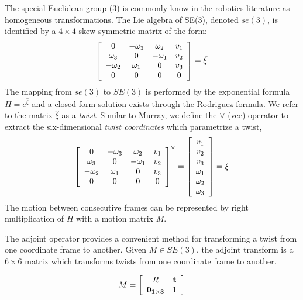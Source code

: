 \documentclass[a4paper,10pt]{article}
\title{}
\author{}
\begin{document}
The special Euclidean group (3) is commonly know in the robotics literature as
homogeneous transformations.  The Lie algebra of SE(3), denoted $se(3)$, is
identified by a $4\times4$ skew symmetric matrix of the form:
\begin{equation}
\left[\begin{array}{c c c c}
  0 & -\omega_3 & \omega_2 & v_1 \\
  \omega_3 & 0 & -\omega_1 & v_2 \\
  -\omega_2 & \omega_1 & 0 & v_3 \\
  0 & 0 & 0 & 0 \\
\end{array}\right] = \hat{\xi}
\end{equation}
The mapping from $se(3)$ to $SE(3)$ is performed
by the exponential formula $H = e^{\hat{\xi}}$ and a closed-form solution
exists through the Rodriguez formula.  We refer to the matrix $\hat{\xi}$ as a
{\it twist}. Similar to Murray, we define the $\vee$
(vee) operator to extract the six-dimensional {\it twist coordinates}
which parametrize a twist,
\begin{equation}
\left[\begin{array}{c c c c}
  0 & -\omega_3 & \omega_2 & v_1 \\
  \omega_3 & 0 & -\omega_1 & v_2 \\
  -\omega_2 & \omega_1 & 0 & v_3 \\
  0 & 0 & 0 & 0 \\
\end{array}\right]^{\vee} =
\left[\begin{array}{c}
  v_1 \\ v_2 \\ v_3 \\ \omega_1 \\ \omega_2 \\ \omega_3 \\
\end{array}\right] = \xi
\end{equation}
The motion between consecutive frames can be represented by right
multiplication of $H$ with a motion matrix $M$.  

The adjoint operator provides a convenient
method for transforming a twist from one coordinate frame to
another. Given $M \in SE(3)$, the adjoint transform is a $6
\times 6$ matrix which transforms twists from one coordinate frame to another.

\begin{equation}
  M =
  \left[\begin{array}{c c}
    R & {\bf t} \\
    {\bf 0_{1 \times 3}} & 1 \\
  \end{array}\right]
\end{equation}
\end{document}
